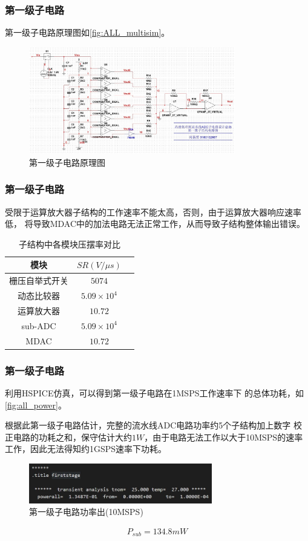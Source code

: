\documentclass[10pt, mathserif]{beamer}	%
\newcommand{\ftitle}[1]{\frametitle{#1}}	%
\begin{document}
	\begin{frame}
		\ftitle{第一级子电路}
		\par 第一级子电路原理图如\autoref{fig:ALL_multisim}。
		\begin{figure}[H]
			\centering
			\includegraphics[width=9cm]{ALL_multisim}
			\caption{\label{fig:ALL_multisim}第一级子电路原理图}
		\end{figure}
	\end{frame}

	\begin{frame}
		\ftitle{第一级子电路}
		受限于运算放大器子结构的工作速率不能太高，否则，由于运算放大器响应速率低，
    	将导致MDAC中的加法电路无法正常工作，从而导致子结构整体输出错误。
		\begin{table}
        \centering
        \caption{\label{tab:SR_com}子结构中各模块压摆率对比}
        \begin{tabular}{|c|c|c|}
            \hline
            模块 & $SR(V/\mu s)$ \\ \hline
            栅压自举式开关 & $5074$ \\ \hline
            动态比较器 & $5.09\times 10^4$ \\ \hline
            运算放大器 & $10.72$ \\ \hline
            sub-ADC & $5.09\times 10^4$ \\ \hline
            MDAC & $10.72$ \\ \hline
        \end{tabular}
    	\end{table}
	\end{frame}

	\begin{frame}
		\ftitle{第一级子电路}
		\par 利用HSPICE仿真，可以得到第一级子电路在1MSPS工作速率下
		的总体功耗，如\autoref{fig:all_power}。
		\par 根据此第一级子电路估计，完整的流水线ADC电路功率约5个子结构加上数字
		校正电路的功耗之和，保守估计大约$ 1W $，由于电路无法工作以大于10MSPS的速率
		工作，因此无法得知约1GSPS速率下功耗。
		\begin{figure}[H]
			\centering
			\includegraphics[width=8cm]{all_power}
			\caption{\label{fig:all_power}第一级子电路功率出(10MSPS)}
		\end{figure}
		\begin{align}
			P_{sub} = 134.8mW
		\end{align}
	\end{frame}
\end{document}
